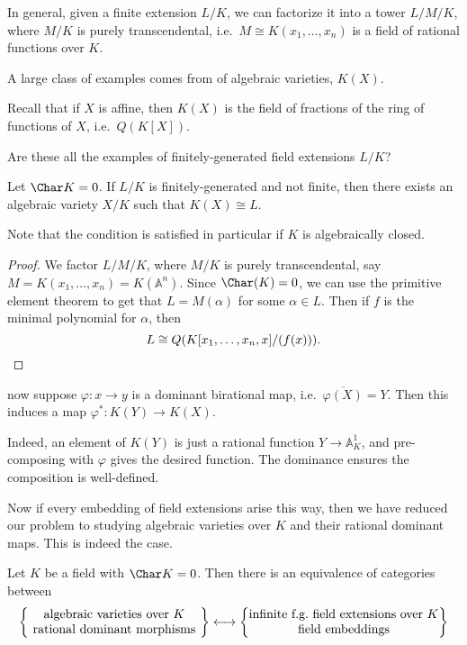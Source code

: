 \documentclass[a4paper]{article}
\newcommand\A{\mathbb{A}}
\begin{document}
In general, given a finite extension $L/K$, we can factorize it into a tower $L/M/K$, where $M/K$ is purely transcendental, i.e.\ $M \cong K(x_1, \ldots, x_n)$ is a field of rational functions over $K$.

A large class of examples comes from  of algebraic varieties, $K(X)$.
\begin{eg}
  Recall that if $X$ is affine, then $K(X)$ is the field of fractions of the ring of functions of $X$, i.e.\ $Q(K[X])$.
\end{eg}

\begin{question}
  Are these all the examples of finitely-generated field extensions $L/K$?
\end{question}


\begin{lemma}
  Let $\Char K = 0$. If $L/K$ is finitely-generated and not finite, then there exists an algebraic variety $X/K$ such that $K(X) \cong L$.
\end{lemma}
Note that the condition is satisfied in particular if $K$ is algebraically closed.

\begin{proof}
  We factor $L/M/K$, where $M/K$ is purely transcendental, say $M = K(x_1, \ldots, x_n) = K(\A^n)$. Since $\Char(K) = 0$, we can use the primitive element theorem to get that $L = M(\alpha)$ for some $\alpha \in L$. Then if $f$ is the minimal polynomial for $\alpha$, then
  \[
    L \cong Q(K[x_1, \ldots, x_n, x]/(f(x))).\qedhere
  \]
\end{proof}


now suppose $\varphi: x \to y$ is a dominant birational map, %
i.e.\ $\overline{\varphi(X)} = Y$. Then this induces a map $\varphi^* : K(Y) \to K(X)$.

Indeed, an element of $K(Y)$ is just a rational function $Y \to \A^1_K$, and pre-composing with $\varphi$ gives the desired function. The dominance ensures the composition is well-defined.

Now if every embedding of field extensions arise this way, then we have reduced our problem to studying algebraic varieties over $K$ and their rational dominant maps. This is indeed the case.
\begin{thm}
  Let $K$ be a field with $\Char K = 0$. Then there is an equivalence of categories between
  \[
    \left\{ \parbox{4.8cm}{\centering algebraic varieties over $K$\\ rational dominant morphisms}\right\} \longleftrightarrow \left\{\parbox{5.3cm}{\centering infinite f.g.\ field extensions over $K$\\field embeddings}\right\}
  \]
\end{thm}
\end{document}
